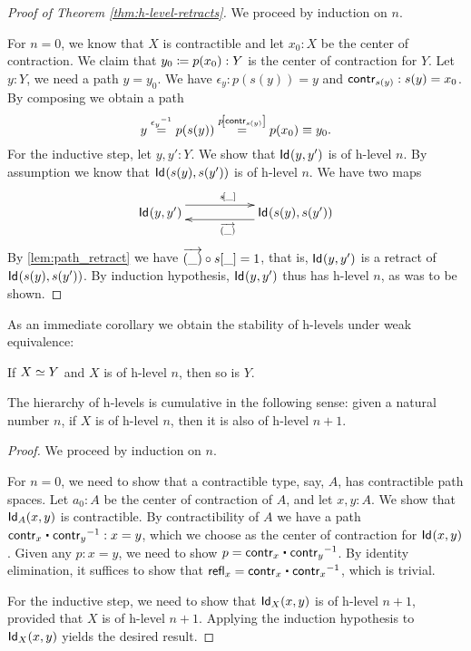 \begin{proof}[Proof of Theorem \autoref{thm:h-level-retracts}]
 We proceed by induction on $n$.
 
 For $n=0$, we know that $X$ is contractible and let $x_0 : X$ be the center of contraction.
 We claim that $y_0 \defeq p(x_0) : Y$ is the center of contraction for $Y$.
 Let $y : Y$, we need a path $y = y_0$. We have $\epsilon_y : p(s(y)) = y$ and $\contr_{s(y)} : s(y) = x_0$.
 By composing we obtain a path
 \[ y \stackrel{\opp{\epsilon_y}}{=} p(s(y)) \stackrel{\map{p}{\contr_{s(y)}}}{=} p(x_0) \equiv y_0  . \]
 For the inductive step, let $y, y' : Y$. We show that $\idtype {y}{y'}$ is of h-level $n$.
 By assumption we know that $\idtype{s(y)}{s(y')}$ is of h-level $n$.
 We have two maps
 \[\xymatrix{\idtype{y}{y'} \ar@<1.5ex>[rr]^{\map{s}{\_}} & & \idtype{s(y)}{s(y')} \ar@<1.2ex>[ll]^{\overrightarrow{(\_)}}}\]
  By \autoref{lem:path_retract} we have $\comp{\map{s}{\_}}{\overrightarrow{(\_)}} = 1$,
   that is, $\idtype {y}{y'}$ is a retract of $\idtype{s(y)}{s(y')}$.
    By induction hypothesis, $\idtype {y}{y'}$ thus has
   h-level $n$, as was to be shown.
\end{proof}

As an immediate corollary we obtain the stability of h-levels under weak equivalence:

\begin{cor}\label{cor:preservation_hlevels_weq}
 If $\eqv{X}{Y}$ and $X$ is of h-level $n$, then so is $Y$.
\end{cor}

\begin{thm}\label{thm:hlevel_cumulative}
 The hierarchy of h-levels is cumulative in the following sense:
   given a natural number $n$, if $X$ is of h-level $n$, then it is also of h-level $n+1$.
\end{thm}

\begin{proof}
 We proceed by induction on $n$.

 For $n = 0$, we need to show that a contractible type, say, $A$, has contractible path spaces.
       Let $a_0: A$ be the center of contraction of $A$, and let $x, y : A$. We show that $\idtype[A]{x}{y}$
       is contractible.
       By contractibility of $A$ we have a path $\contr_x \ct \opp{\contr_y} : x = y$, which we choose as
       the center of contraction for $\idtype{x}{y}$.
       Given any $p : x = y$, we need to show $p = \contr_x \ct \opp{\contr_y}$.
           By identity elimination, it suffices to show that
        $\refl{x} = \contr_x \ct \opp{\contr_x}$, which is trivial.

 For the inductive step, we need to show that $\idtype[X]{x}{y}$ is of h-level $n+1$, provided
          that $X$ is of h-level $n+1$. Applying the induction hypothesis to $\idtype[X]{x}{y}$
         yields the desired result.
\end{proof}

